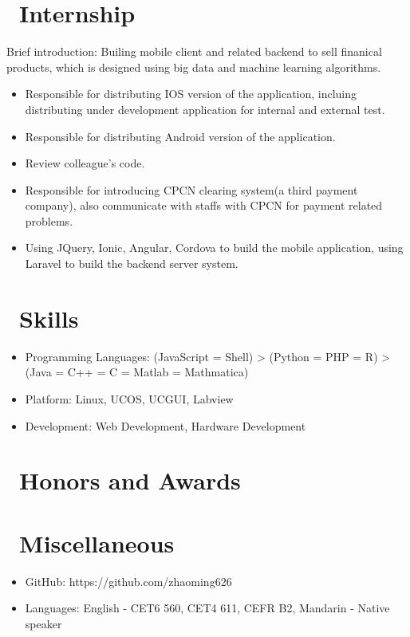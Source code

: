\documentclass{resume}
\begin{document}
\section{\faUsers\ Internship}
Brief introduction: Builing mobile client and related backend to sell finanical products, which is designed using big data and machine learning algorithms.
\begin{itemize}
  \item Responsible for distributing IOS version of the application, incluing distributing under development application for internal and external test.
  \item Responsible for distributing Android version of the application.
  \item Review colleague's code.
  \item Responsible for introducing CPCN clearing system(a third payment company), also communicate with staffs with CPCN for payment related problems.
  \item Using JQuery, Ionic, Angular, Cordova to build the mobile application, using Laravel to build the backend server system.
\end{itemize}


\section{\faCogs\ Skills}
\begin{itemize}[parsep=0.5ex]
  \item Programming Languages: (JavaScript = Shell) > (Python = PHP = R) > (Java = C++ = C = Matlab = Mathmatica)
  \item Platform: Linux, UCOS, UCGUI, Labview
  \item Development: Web Development, Hardware Development
\end{itemize}

\section{\faHeartO\ Honors and Awards}

\section{\faInfo\ Miscellaneous}
\begin{itemize}[parsep=0.5ex]
  \item GitHub: https://github.com/zhaoming626
  \item Languages: English - CET6 560, CET4 611, CEFR B2, Mandarin - Native speaker
\end{itemize}

%
%
\end{document}
